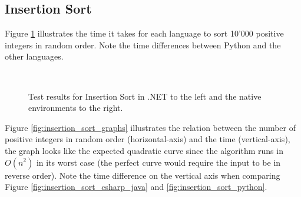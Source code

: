 \subsection{Insertion Sort}

Figure \ref{fig:insertion_sort_results} illustrates the time it takes for each language to sort 10'000 positive integers in random order. Note the time differences between Python and the other languages.

\begin{figure}[h]
	\centering
	\mbox{
	}
	\caption{Test results for Insertion Sort in .NET to the left and the native environments to the right.}
	\label{fig:insertion_sort_results}
\end{figure}

Figure \ref{fig:insertion_sort_graphs} illustrates the relation between the number of positive integers in random order (horizontal-axis) and the time (vertical-axis), the graph looks like the expected quadratic curve since the algorithm runs in $O(n^2)$ in its worst case (the perfect curve would require the input to be in reverse order). Note the time difference on the vertical axis when comparing Figure \ref{fig:insertion_sort_csharp_java} and \ref{fig:insertion_sort_python}.

